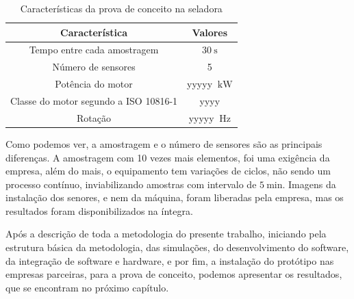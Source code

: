 \begin{table}[H]
    \caption{Características da prova de conceito na seladora}
    \label{tab:seladora}
    \centering%
    \begin{minipage}{.55\textwidth}
      \begin{tabular*}{\textwidth}{c|c}
        \hline
        Característica                          & Valores                                    \\ \hline
        \hline
        Tempo entre cada amostragem             &  $\SI{30}{\second}$                        \\
        Número de sensores                      &  5                                         \\ 
        Potência do motor                       &  yyyyy $\SI{}{\kilo\watt}$                 \\
        Classe do motor segundo a  ISO 10816-1  &  yyyy                                      \\
        Rotação                                 & yyyyy $\SI{}{\hertz}$                      \\ \hline
      \end{tabular*}
    \end{minipage}
  \end{table}

Como podemos ver, a amostragem e o número de sensores são as principais diferenças. A amostragem com 10 vezes mais elementos, foi uma exigência
da empresa, além do mais, o equipamento tem variações de ciclos, não sendo um processo contínuo, inviabilizando amostras com intervalo de 
$\SI{5}{\minute}$. Imagens da instalação dos senores, e nem da máquina, foram liberadas pela empresa, mas os resultados foram 
disponibilizados na íntegra.

Após a descrição de toda a metodologia do presente trabalho, iniciando pela estrutura básica da metodologia, das simulações, do desenvolvimento
do software, da integração de software e hardware, e por fim, a instalação do protótipo nas empresas parceiras, para a prova de conceito, 
podemos apresentar os resultados, que se encontram no próximo capítulo.
